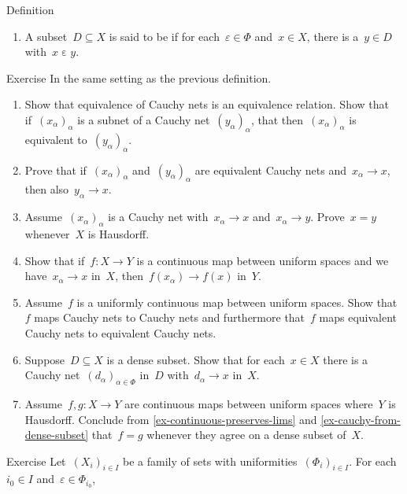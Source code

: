 \documentclass[b]{subfiles}
\begin{document}
\begin{parsec}
\begin{point}{Definition}
\begin{enumerate}
\item
A subset~$D \subseteq X$ is said to be 
    if for each~$\varepsilon \in \Phi$ and~$x \in X$,
    there is a~$y \in D$
    with~$x \mathrel\varepsilon y$.
\end{enumerate}
\end{point}
\begin{point}{Exercise}%
    In the same setting as the previous definition.
    \begin{enumerate}
\item
    Show that equivalence of Cauchy nets is an equivalence relation.
    Show that if~$(x_\alpha)_\alpha$ is a subnet of
    a Cauchy net~$(y_\alpha)_\alpha$,
        that then~$(x_\alpha)_\alpha$ is equivalent to~$(y_\alpha)_\alpha$.
\item
    Prove that if~$(x_\alpha)_\alpha$ and~$(y_\alpha)_\alpha$
        are equivalent Cauchy nets and~$x_\alpha \to x$,
        then also~$y_\alpha \to x$.
\item
    Assume~$(x_\alpha)_\alpha$ is a Cauchy net with~$x_\alpha \to x$
        and~$x_\alpha \to y$.  Prove~$x = y$ whenever~$X$ is Hausdorff.
\item\label{ex-continuous-preserves-lims}
    Show that if~$f\colon X \to Y$ is a continuous map
    between uniform spaces
        and we have~$x_\alpha \to x$ in~$X$,
        then~$f(x_\alpha) \to f(x)$ in~$Y$.
\item
    Assume~$f$ is a uniformly continuous map between uniform spaces.
    Show that $f$ maps Cauchy nets to Cauchy nets
    and furthermore that~$f$ maps equivalent Cauchy nets to equivalent
        Cauchy nets.
\item\label{ex-cauchy-from-dense-subset}
    Suppose~$D \subseteq X$ is a dense subset.
    Show that for each~$x \in X$
    there is a Cauchy net~$(d_\alpha)_{\alpha \in \Phi}$
    in~$D$ with~$d_\alpha \to x$ in~$X$.
\item
    Assume~$f,g\colon X \to Y$ are continuous maps between uniform spaces
        where~$Y$ is Hausdorff.
Conclude from \ref{ex-continuous-preserves-lims} and
    \ref{ex-cauchy-from-dense-subset}
    that~$f=g$ whenever they agree on a dense subset of~$X$.
    \end{enumerate}
\end{point}
\begin{point}{Exercise}%
    Let~$(X_i)_{i \in I}$ be a family of sets with
        uniformities~$(\Phi_i)_{i \in I}$.
    For each~$i_0 \in I$
    and~$\varepsilon \in \Phi_{i_0}$,

\end{point}
\end{parsec}
\end{document}
